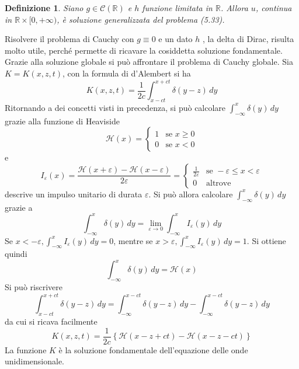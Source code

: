 \documentclass[a4paper,12pt, draft]{article}
\theoremstyle{break}
\newtheorem{definition}{Definizione}[section]
\let\epsilon\varepsilon
\numberwithin{equation}{section}
\begin{document}
\begin{definition}
  Siano \(g \in \mathcal{C}(\mathbb{R})\) e \(h\) funzione limitata in \(\mathbb{R}\). Allora \(u\), continua in \(\mathbb{R} \times [0, +\infty)\), è soluzione generalizzata del problema (5.33).
\end{definition}
Risolvere il problema di Cauchy con \(g \equiv 0\) e un dato \(h\) , la delta di Dirac, risulta molto utile, perché permette di ricavare la cosiddetta soluzione fondamentale. Grazie alla soluzione globale si può affrontare il problema di Cauchy globale. Sia \(K = K(x,z,t)\), con la formula di d'Alembert si ha 
\begin{equation}
  K(x,z,t) = \frac{1}{2c} \int_{x-ct}^{x+ct} \delta(y-z) \, dy
\end{equation}
Ritornando a dei concetti visti in precedenza, si può calcolare \(\int_{-\infty}^x\delta(y) \, dy\) grazie alla funzione di Heaviside
\[
\mathcal{H}(x) = \begin{cases}
  1 & \text{se }x \geq 0 \\
  0 & \text{se } x < 0
\end{cases}
\]
e 
\begin{equation}
  I_{\epsilon}(x) = \frac{\mathcal{H}(x + \epsilon) - \mathcal{H}(x - \epsilon)}{2\epsilon} = \begin{cases}
    \frac{1}{2\epsilon} &\mbox{se } -\epsilon \leq x < \epsilon \\
    0 &\mbox{altrove}  
  \end{cases}
\end{equation}
descrive un impulso unitario di durata \(\epsilon\). Si può allora calcolare \(\int_{-\infty}^x \delta(y)\, dy\) grazie a 
\[
 \int_{-\infty}^x \delta(y) \, dy =\lim_{\epsilon \to 0} \int_{-\infty}^x I_{\epsilon} (y) \, dy
\]
Se \(x < -\epsilon, \int_{-\infty}^x I_{\epsilon}(y) \, dy = 0\), mentre se \(x > \epsilon, \int_{-\infty}^x I_{\epsilon}(y) \, dy = 1\). Si ottiene quindi
\begin{equation}
  \int_{-\infty}^x \delta(y) \, dy = \mathcal{H}(x)
\end{equation}
Si può riscrivere 
\[
  \int_{x-ct}^{x+ct} \delta(y-z) \, dy = \int_{-\infty}^{x-ct} \delta(y-z) \, dy - \int_{-\infty}^{x-ct} \delta(y-z) \, dy
\]
da cui si ricava facilmente
\begin{equation}
  K(x,z,t) = \frac{1}{2c}\left\lbrace \mathcal{H}(x-z+ct) - \mathcal{H}(x-z-ct)\right\rbrace
\end{equation}
La funzione \(K\) è la soluzione fondamentale dell'equazione delle onde unidimensionale. \\
\end{document}
